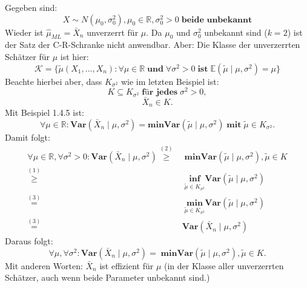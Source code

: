 \documentclass[10pt]{article}
\newcommand{\FZV}{X_1, \ldots, X_n} %
\newcommand{\IR}{\mathbb{R}} %
\newcommand{\EW}{\mathbb{E}} %
\newcommand{\eqname}[1]{\tag*{#1}}%
\newcommand{\Var}{\textbf{Var}} %
\newenvironment{BSP}[1][]
{\begin{Beispiel}[frametitle=#1]}{\end{Beispiel}}
\begin{document}
	\begin{BSP}[Beispiel 1.4.6 (Anwendung C-R-Schranke Normalverteilung mit unbekannten Parametern)]
		Gegeben sind:
		\begin{equation*}
			X \sim N(\mu_0, \sigma_0^2), \mu_0 \in \IR, \sigma_0^2 > 0 \; \textbf{beide unbekannt}
		\end{equation*}
		Wieder ist $\hat{\mu}_{ML} = \bar{X}_n$ unverzerrt für $\mu$. Da $\mu_0$ und $\sigma^2_0$ unbekannt sind ($k=2$) ist der Satz der C-R-Schranke nicht anwendbar. Aber: Die Klasse der unverzerrten Schätzer für $\mu$ ist hier:
		\begin{equation*}
			\mathcal{K} = \{\tilde{\mu}(\FZV): \forall \mu \in \IR \; \textbf{und} \; \forall \sigma^2 > 0 \; \textbf{ist} \; \EW(\tilde{\mu} \mid \mu, \sigma^2) = \mu\}
		\end{equation*}
		Beachte hierbei aber, dass $K_{\sigma^2}$ wie im letzten Beispiel ist:
		\begin{equation*}
			K \subseteq K_{\sigma^2} \; \textbf{für jedes} \; \sigma^2 > 0, \eqname{(1)}
		\end{equation*}
		\begin{equation*}
			\bar{X}_n \in K \eqname{(2)}.
		\end{equation*}
		Mit Beispiel 1.4.5 ist:
		\begin{equation*}
			\forall \mu \in \IR: \Var (\bar{X}_n \mid \mu, \sigma^2) = \textbf{min}\Var(\tilde{\mu} \mid \mu, \sigma^2) \; \textbf{mit} \; \tilde{\mu} \in K_{\sigma^2}. \eqname{(3)}
		\end{equation*}
		Damit folgt:
		\begin{equation*}
			\begin{split}
				\forall \mu \in \IR, \forall \sigma^2 >0: \Var(\bar{X}_n \mid \mu, \sigma^2) \overset{(2)}{\geq}& \; \textbf{min} \Var(\tilde{\mu}\mid \mu,\sigma^2), \tilde{\mu} \in K\\
				\overset{(1)}{\geq}& \; \underset{\tilde{\mu} \in K_{\sigma^2}}{\textbf{inf}}\Var(\tilde{\mu} \mid \mu, \sigma^2)\\
				\overset{(3)}{=}& \; \underset{\tilde{\mu} \in K_{\sigma^2}}{\textbf{min}} \Var(\tilde{\mu} \mid \mu, \sigma^2) \\
				\overset{(3)}{=}& \Var(\bar{X}_n \mid \mu, \sigma^2)
			\end{split}
		\end{equation*}
		Daraus folgt:
		\begin{equation*}
			\forall \mu, \forall \sigma^2: \Var(\bar{X}_n \mid \mu, \sigma^2) = \; \textbf{min} \Var(\tilde{\mu} \mid \mu, \sigma^2), \tilde{\mu} \in K.
		\end{equation*}
		Mit anderen Worten: $\bar{X}_n$ ist effizient für $\mu$ (in der Klasse aller unverzerrten Schätzer, auch wenn beide Parameter unbekannt sind.)
	\end{BSP}
	
\end{document}
